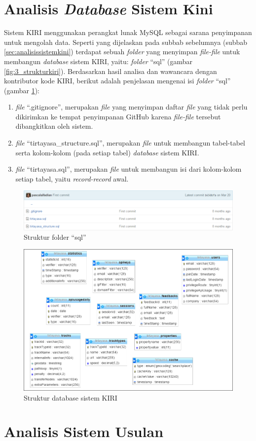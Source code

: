 \section{Analisis \textit{Database} Sistem Kini}
\label{sec:analisisdatabasesistemkini}
Sistem KIRI menggunakan perangkat lunak MySQL sebagai sarana penyimpanan untuk mengolah data. Seperti yang dijelaskan pada subbab sebelumnya (subbab \ref{sec:analisissistemkini}) terdapat sebuah \textit{folder} yang menyimpan \textit{file-file} untuk membangun \textit{database} sistem KIRI, yaitu: \textit{folder} ``sql'' (gambar \ref{fig:3_strukturkiri}). Berdasarkan hasil analisa dan wawancara dengan kontributor kode KIRI, berikut adalah penjelasan mengenai isi \textit{folder} ``sql'' (gambar \ref{fig:4_struktursql}):
\begin{enumerate}
	\item \textit{file} ``.gitignore'', merupakan \textit{file} yang menyimpan daftar \textit{file} yang tidak perlu dikirimkan ke tempat penyimpanan GitHub karena \textit{file-file} tersebut dibangkitkan oleh sistem.
	\item \textit{file} ``tirtayasa\_structure.sql'', merupakan \textit{file} untuk membangun tabel-tabel serta kolom-kolom (pada setiap tabel) \textit{database} sistem KIRI.
	\item \textit{file} ``tirtayasa.sql'', merupakan \textit{file} untuk membangun isi dari kolom-kolom setiap tabel, yaitu \textit{record-record} awal.
\end{enumerate}

\begin{figure}[htbp]
	\centering
		\includegraphics[scale=0.5]{Gambar/4_struktursql.png}
	\caption{Struktur folder ``sql''}
	\label{fig:4_struktursql}
\end{figure}

\begin{figure}[htbp]
	\centering
		\includegraphics[scale=0.7]{Gambar/4_strukturdatabase.PNG}
	\caption{Struktur database sistem KIRI}
	\label{fig:4_strukturdatabase}
\end{figure}


\section{Analisis Sistem Usulan}
\label{sec:analisissistemusulan}
